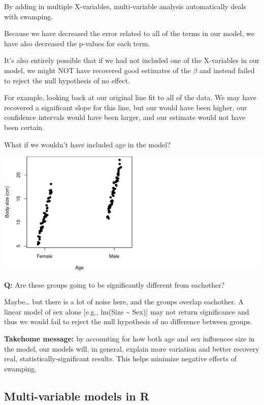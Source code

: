 \documentclass[
]{article}
\begin{document}
By adding in multiple X-variables, multi-variable analysis automatically
deals with swamping.

Because we have decreased the error related to all of the terms in our
model, we have also decreased the p-values for each term.

It's also entirely possible that if we had not included one of the
X-variables in our model, we might NOT have recovered good estimates of
the \(\beta\) and instead failed to reject the null hypothesis of no
effect.

For example, looking back at our original line fit to all of the data.
We may have recovered a significant slope for this line, but our would
have been higher, our confidence intervals would have been larger, and
our estimate would not have been certain.

What if we wouldn't have included age in the model?

\includegraphics{lecture_12_files/figure-latex/example4-1.pdf}

\textbf{Q:} Are these groups going to be significantly different from
eachother?

Maybe\ldots{} but there is a lot of noise here, and the groups overlap
eachother. A linear model of sex alone {[}e.g., lm(Size
\textasciitilde{} Sex){]} may not return significance and thus we would
fail to reject the null hypothesis of no difference between groups.

\textbf{Takehome message:} by accounting for how both age and sex
influences size in the model, our models will, in general, explain more
variation and better recovery real, statistically-significant results.
This helps minimize negative effects of swamping.

\subsection{Multi-variable models in
R}\label{multi-variable-models-in-r}
\end{document}
